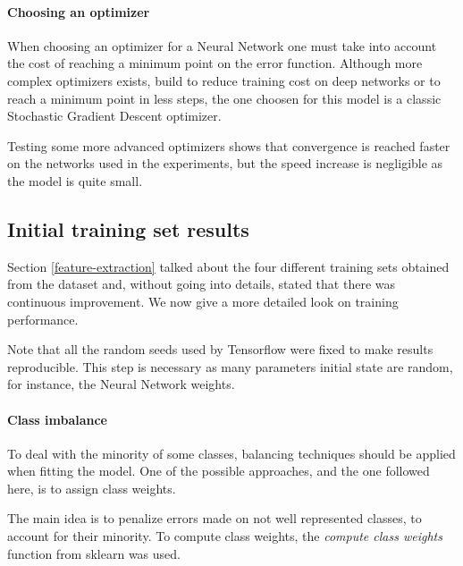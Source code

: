 \paragraph{Choosing an optimizer}
When choosing an optimizer for a Neural Network one must take into account the 
cost of reaching a minimum point on the error function.
Although more complex optimizers exists, build to reduce training 
cost on deep networks or to reach a minimum point in less steps, the one choosen 
for this model is a classic Stochastic Gradient Descent optimizer.

Testing some more advanced optimizers shows that convergence is reached faster on the 
networks used in the experiments, but the speed increase is negligible as the model
is quite small.

\subsection{Initial training set results}

Section \vref{feature-extraction} talked about the four different 
training sets obtained from the dataset and, without going into details, 
stated that there was continuous improvement. 
We now give a more detailed look on training performance.

Note that all the random seeds used by Tensorflow were fixed 
to make results reproducible. This step is necessary as many parameters initial 
state are random, for instance, the Neural Network weights.

\paragraph{Class imbalance}
To deal with the minority of some classes, balancing techniques should be 
applied when fitting the model. One of the possible approaches, and the one followed
here, is to assign class weights. 

The main idea is to penalize errors made on not well represented classes, to account 
for their minority. To compute class weights, the \emph{compute class weights} function
from sklearn was used.~\cite{classweight}

